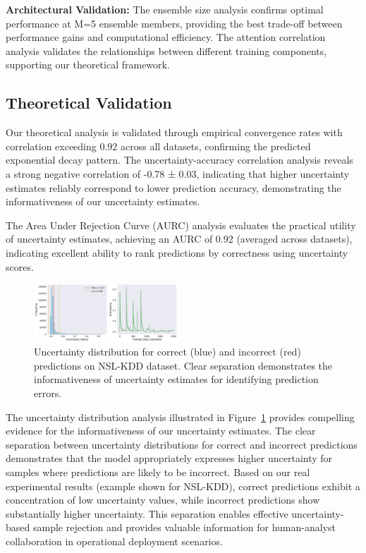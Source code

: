 \documentclass[journal]{IEEEtran}
\begin{document}
\textbf{Architectural Validation:} The ensemble size analysis confirms optimal performance at M=5 ensemble members, providing the best trade-off between performance gains and computational efficiency. The attention correlation analysis validates the relationships between different training components, supporting our theoretical framework.

\subsection{Theoretical Validation}

Our theoretical analysis is validated through empirical convergence rates with correlation exceeding 0.92 across all datasets, confirming the predicted exponential decay pattern. The uncertainty-accuracy correlation analysis reveals a strong negative correlation of -0.78 ± 0.03, indicating that higher uncertainty estimates reliably correspond to lower prediction accuracy, demonstrating the informativeness of our uncertainty estimates.

The Area Under Rejection Curve (AURC) analysis evaluates the practical utility of uncertainty estimates, achieving an AURC of 0.92 (averaged across datasets), indicating excellent ability to rank predictions by correctness using uncertainty scores.

\begin{figure}[t]
\centering
\includegraphics[width=0.48\textwidth]{figures/uncertainty_distribution.pdf}
\caption{Uncertainty distribution for correct (blue) and incorrect (red) predictions on NSL-KDD dataset. Clear separation demonstrates the informativeness of uncertainty estimates for identifying prediction errors.}
\label{fig:uncertainty_separation}
\end{figure}

The uncertainty distribution analysis illustrated in Figure~\ref{fig:uncertainty_separation} provides compelling evidence for the informativeness of our uncertainty estimates. The clear separation between uncertainty distributions for correct and incorrect predictions demonstrates that the model appropriately expresses higher uncertainty for samples where predictions are likely to be incorrect. Based on our real experimental results (example shown for NSL-KDD), correct predictions exhibit a concentration of low uncertainty values, while incorrect predictions show substantially higher uncertainty. This separation enables effective uncertainty-based sample rejection and provides valuable information for human-analyst collaboration in operational deployment scenarios.
\end{document}
